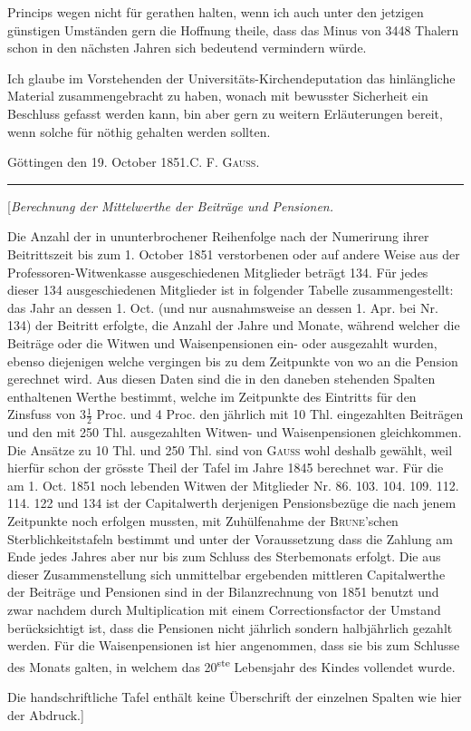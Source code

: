 Princips wegen nicht für gerathen halten, wenn ich auch unter den jetzigen günstigen Umständen gern die Hoffnung theile, dass das Minus von 3448 Thalern schon in den nächsten Jahren sich bedeutend vermindern würde.

\medskip
Ich glaube im Vorstehenden der Universitäts-Kirchendeputation das hinlängliche Material zusammengebracht zu haben, wonach mit bewusster Sicherheit ein Beschluss gefasst werden kann, bin aber gern zu weitern Erläuterungen bereit, wenn solche für nöthig gehalten werden sollten.

Göttingen den 19. October 1851.\hfill C. F. \textsc{Gauss}.
\begin{center}\rule{.28\linewidth}{.3pt}\end{center}

\Needspace{75pt}
\begin{center}[\textit{Berechnung der Mittelwerthe der Beiträge und Pensionen.}\end{center}
\noindent\hspace*{\parindent}Die Anzahl der in ununterbrochener Reihenfolge nach der Numerirung ihrer Beitrittszeit bis zum 1. October 1851 verstorbenen oder auf andere Weise aus der Professoren-Witwenkasse ausgeschiedenen Mitglieder beträgt 134. Für jedes dieser 134 ausgeschiedenen Mitglieder ist in folgender Tabelle zusammengestellt: das Jahr an dessen 1. Oct. (und nur ausnahmsweise an dessen 1. Apr. bei Nr. 134) der Beitritt erfolgte, die Anzahl der Jahre und Monate, während welcher die Beiträge oder die Witwen und Waisenpensionen ein- oder ausgezahlt wurden, ebenso diejenigen welche vergingen bis zu dem Zeitpunkte von wo an die Pension gerechnet wird. Aus diesen Daten sind die in den daneben stehenden Spalten enthaltenen Werthe bestimmt, welche im Zeitpunkte des Eintritts für den Zinsfuss von \(3\tfrac{1}{2}\) Proc. und 4 Proc. den jährlich mit 10 Thl. eingezahlten Beiträgen und den mit 250 Thl. ausgezahlten Witwen- und Waisenpensionen gleichkommen. Die Ansätze zu 10 Thl. und 250 Thl. sind von \textsc{Gauss} wohl deshalb gewählt, weil hierfür schon der grösste Theil der Tafel im Jahre 1845 berechnet war. Für die am 1. Oct. 1851 noch lebenden Witwen der Mitglieder Nr. 86. 103. 104. 109. 112. 114. 122 und 134 ist der Capitalwerth derjenigen Pensionsbezüge die nach jenem Zeitpunkte noch erfolgen mussten, mit Zuhülfenahme der \textsc{Brune}’schen Sterblichkeitstafeln bestimmt und unter der Voraussetzung dass die Zahlung am Ende jedes Jahres aber nur bis zum Schluss des Sterbemonats erfolgt. Die aus dieser Zusammenstellung sich unmittelbar ergebenden mittleren Capitalwerthe der Beiträge und Pensionen sind in der Bilanzrechnung von 1851 benutzt und zwar nachdem durch Multiplication mit einem Correctionsfactor der Umstand berücksichtigt ist, dass die Pensionen nicht jährlich sondern halbjährlich gezahlt werden. Für die Waisenpensionen ist hier angenommen, dass sie bis zum Schlusse des Monats galten, in welchem das 20\textsuperscript{ste} Lebensjahr des Kindes vollendet wurde.

Die handschriftliche Tafel enthält keine Überschrift der einzelnen Spalten wie hier der Abdruck.]

